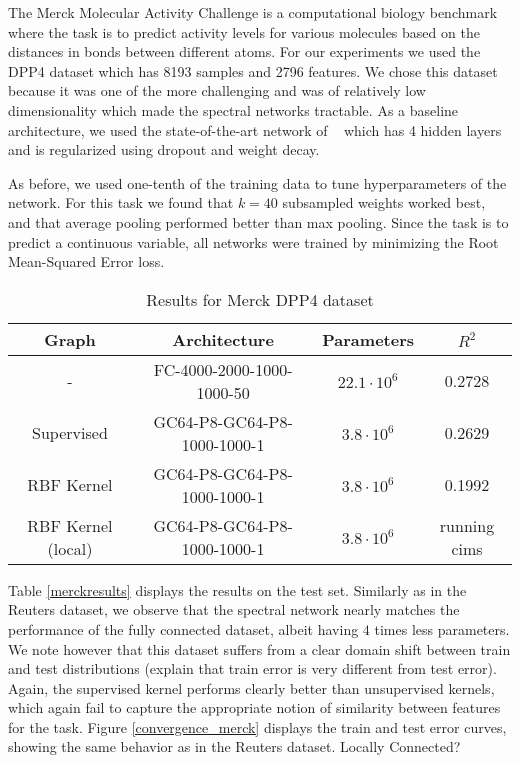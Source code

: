 \documentclass{article} %
\begin{document}
The Merck Molecular Activity Challenge is a computational biology benchmark where the task is to predict activity levels for various molecules based on the distances in bonds between different atoms. For our experiments we used the DPP4 dataset which has 8193 samples and 2796 features. We chose this dataset because it was one of the more challenging and was of relatively low dimensionality which made the spectral networks tractable. As a baseline architecture, we used the state-of-the-art network of ~\cite{ma2015} which has 4 hidden layers and is regularized using dropout and weight decay. 

As before, we used one-tenth of the training data to tune hyperparameters of the network. For this task we found that $k=40$ subsampled weights worked best, and that average pooling performed better than max pooling. Since the task is to predict a continuous variable, all networks were trained by minimizing the Root Mean-Squared Error loss.

\begin{table}[H]
\caption{Results for Merck DPP4 dataset}
\begin{center}
\begin{tabular}{|c|c|c|c|}
\hline
Graph & Architecture & Parameters & $R^2$\\
\hline
- &FC-4000-2000-1000-1000-50 & $22.1 \cdot 10^6$ & 0.2728 \\
Supervised & GC64-P8-GC64-P8-1000-1000-1 & $3.8\cdot 10^6$ & 0.2629 \\
RBF Kernel & GC64-P8-GC64-P8-1000-1000-1 & $3.8\cdot 10^6$ & 0.1992 \\
RBF Kernel (local) & GC64-P8-GC64-P8-1000-1000-1 & $3.8\cdot 10^6$ & running cims \\
\hline
\end{tabular}
\end{center}
\end{table}


Table \ref{merckresults} displays the results on the test set. Similarly as in the Reuters dataset, we observe that the spectral network nearly matches the performance of the fully connected dataset, albeit having $4$ times less parameters. We note however that this dataset suffers from a clear domain shift between train and test distributions (explain that train error is very different from test error).
Again, the supervised kernel performs clearly better than unsupervised kernels, which again fail to capture the appropriate notion of similarity between features for the task. Figure \ref{convergence_merck} displays the train and test error curves, showing the same behavior as in the Reuters dataset. Locally Connected? 
\end{document}
